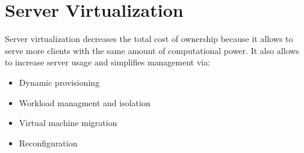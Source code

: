 \section{Server Virtualization}
Server virtualization decreases the total cost of ownership because it allows to serve more clients with the same amount of computational power. It also allows to increase server usage and simplifies management via:
\begin{itemize}
    \item Dynamic provisioning
    \item Workload managment and isolation
    \item Virtual machine migration
    \item Reconfiguration
\end{itemize}